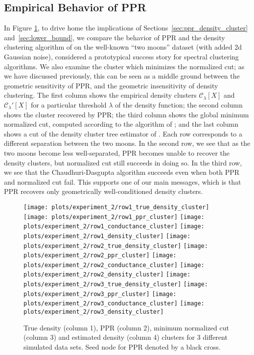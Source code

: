 \documentclass[twoside,11pt]{article}
\newcommand{\1}{\mathbf{1}}
\newcommand{\mc}[1]{\mathcal{#1}}
\begin{document}
\subsection{Empirical Behavior of PPR} 
\label{subsec:empirical_behavior_ppr}
In Figure \ref{fig:moons}, to drive home the implications of Sections~\ref{sec:ppr_density_cluster} and~\ref{sec:lower_bound}, we compare the behavior of PPR and the density clustering algorithm of \citet{chaudhuri2010} on the well-known ``two moons'' dataset (with added 2d Gaussian noise), considered a prototypical success story for spectral clustering algorithms. We also examine the cluster which minimizes the normalized cut; as we have discussed previously, this can be seen as a middle ground between the geometric sensitivity of PPR, and the geometric insensitivity of density clustering. The first column shows the empirical density clusters $\mc{C}_{\lambda}[X]$ and $\mc{C}_{\lambda}'[X]$ for a particular threshold $\lambda$ of the density function; the second column shows the cluster recovered by PPR; the third column shows the global minimum normalized cut, computed according to the algorithm of \citet{bresson2013}; and the last column shows a cut of the density cluster tree estimator of \citet{chaudhuri2010}. Each row corresponds to a different separation between the two moons. In the second row, we see that as the two moons become less well-separated, PPR becomes unable to recover the density clusters, but normalized cut still succeeds in doing so. In the third row, we see that the Chaudhuri-Dasgupta algorithm succeeds even when both PPR and normalized cut fail. This supports one of our main messages, which is that PPR recovers only geometrically well-conditioned density clusters.

\begin{figure}
	\centering
	\texttt{[image: plots/experiment\_2/row1\_true\_density\_cluster]}
	\texttt{[image: plots/experiment\_2/row1\_ppr\_cluster]}
	\texttt{[image: plots/experiment\_2/row1\_conductance\_cluster]}
	\texttt{[image: plots/experiment\_2/row1\_density\_cluster]}
	\texttt{[image: plots/experiment\_2/row2\_true\_density\_cluster]}
	\texttt{[image: plots/experiment\_2/row2\_ppr\_cluster]}
	\texttt{[image: plots/experiment\_2/row2\_conductance\_cluster]}
	\texttt{[image: plots/experiment\_2/row2\_density\_cluster]}
	\texttt{[image: plots/experiment\_2/row3\_true\_density\_cluster]}
	\texttt{[image: plots/experiment\_2/row3\_ppr\_cluster]}
	\texttt{[image: plots/experiment\_2/row3\_conductance\_cluster]}
	\texttt{[image: plots/experiment\_2/row3\_density\_cluster]}
	\caption{\small True density (column 1), PPR (column 2), minimum normalized
		cut (column 3) and estimated density (column 4) clusters for 3 different 
		simulated data sets. Seed node for PPR denoted by a black cross.} 
	\label{fig:moons}
\end{figure}
\end{document}
